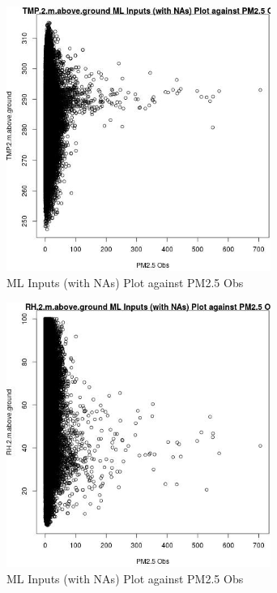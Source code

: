 \begin{figure} 
\centering  
\includegraphics[width=0.77\textwidth]{Code_Outputs/Report_ML_input_PM25_Step4_part_e_de_duplicated_aves_compiled_2019-05-14wNAs_TMP2mabovegroundvPM25_Obs.jpg} 
\caption{\label{fig:Report_ML_input_PM25_Step4_part_e_de_duplicated_aves_compiled_2019-05-14wNAsTMP2mabovegroundvPM25_Obs}ML Inputs (with NAs) Plot against PM2.5 Obs} 
\end{figure} 
 

\begin{figure} 
\centering  
\includegraphics[width=0.77\textwidth]{Code_Outputs/Report_ML_input_PM25_Step4_part_e_de_duplicated_aves_compiled_2019-05-14wNAs_RH2mabovegroundvPM25_Obs.jpg} 
\caption{\label{fig:Report_ML_input_PM25_Step4_part_e_de_duplicated_aves_compiled_2019-05-14wNAsRH2mabovegroundvPM25_Obs}ML Inputs (with NAs) Plot against PM2.5 Obs} 
\end{figure} 
 

